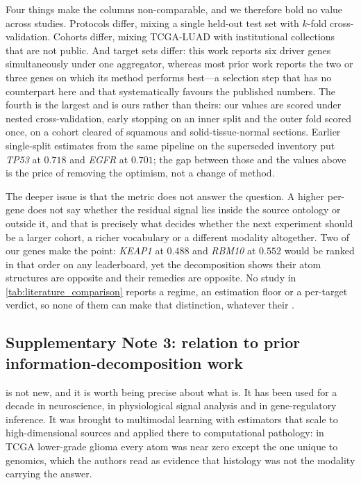 Four things make the columns non-comparable, and we therefore bold no
value across studies. Protocols differ, mixing a single held-out test set
with $k$-fold cross-validation. Cohorts differ, mixing TCGA-LUAD with
institutional collections that are not public. And target sets differ:
this work reports six driver genes simultaneously under one aggregator,
whereas most prior work reports the two or three genes on which its
method performs best---a selection step that has no counterpart here and
that systematically favours the published numbers.
The fourth is the largest and is ours rather than theirs: our values are
scored under nested cross-validation, early stopping on an inner split
and the outer fold scored once, on a cohort cleared of squamous and
solid-tissue-normal sections. Earlier single-split estimates from the
same pipeline on the superseded inventory put \textit{TP53} at $0.718$
and \textit{EGFR} at $0.701$; the gap between those and the values above
is the price of removing the optimism, not a change of method.

The deeper issue is that the metric does not answer the question. A
higher per-gene \auroc{} does not say whether the residual signal lies
inside the source ontology or outside it, and that is precisely what
decides whether the next experiment should be a larger cohort, a richer
vocabulary or a different modality altogether. Two of our genes make the
point: \textit{KEAP1} at $0.488$ and \textit{RBM10} at $0.552$ would be
ranked in that order on any leaderboard, yet the decomposition shows
their atom structures are opposite and their remedies are opposite. No
study in \cref{tab:literature_comparison} reports a regime, an estimation floor or a
per-target verdict, so none of them can make that distinction, whatever
their \auroc{}.

\subsection*{Supplementary Note 3: relation to prior information-decomposition work}


 is not new, and it is worth being precise about what is.
It has been used for a decade in neuroscience, in physiological signal
analysis and in gene-regulatory inference. It was
brought to multimodal learning with estimators that scale to
high-dimensional sources and applied there to computational pathology:
in TCGA lower-grade glioma every atom was near zero except the one
unique to genomics, which the authors read as evidence that histology
was not the modality carrying the answer.\cite{liang2023quantifying}

